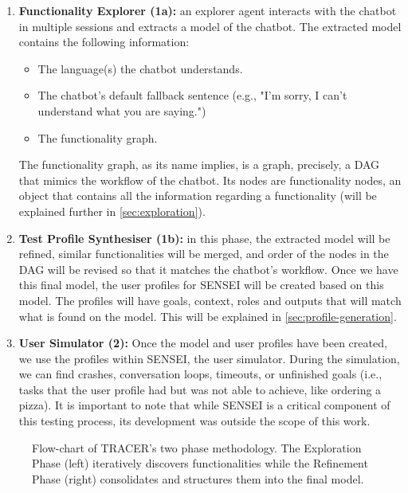 \begin{enumerate}
  \item \textbf{Functionality Explorer (1a):}
    an explorer agent interacts with the chatbot in multiple sessions
    and extracts a model of the chatbot.
    The extracted model contains the following information:
    \begin{itemize}
      \item The language(s) the chatbot understands.
      \item The chatbot's default fallback sentence (e.g., "I'm sorry, I can't understand what you are saying.")
      \item The functionality graph.
    \end{itemize}

    The functionality graph, as its name implies,
    is a graph, precisely, a \ac{DAG}
    that mimics the workflow of the chatbot.
    Its nodes are functionality nodes,
    an object that contains all the information regarding a functionality
    (will be explained further in
    \autoref{sec:exploration}).

  \item \textbf{Test Profile Synthesiser (1b):}
    in this phase, the extracted model will be refined,
    similar functionalities will be merged,
    and order of the nodes in the \ac{DAG} will be revised
    so that it matches the chatbot's workflow.
    Once we have this final model,
    the user profiles for SENSEI will be created based on this model.
    The profiles will have goals, context, roles and outputs
    that will match what is found on the model.
    This will be explained in \autoref{sec:profile-generation}.

  \item \textbf{User Simulator (2):}
    Once the model and user profiles have been created,
    we use the profiles within SENSEI, the user simulator.
    During the simulation,
    we can find crashes, conversation loops, timeouts,
    or unfinished goals (i.e., tasks that the user profile had
    but was not able to achieve, like ordering a pizza).
    It is important to note that
    while SENSEI is a critical component of this testing process,
    its development was outside the scope of this work.
\end{enumerate}


\begin{figure}[!htbp]
    \centering
    
    \caption{Flow-chart of TRACER's two phase methodology.
    The Exploration Phase (left) iteratively discovers functionalities
    while the Refinement Phase (right) consolidates and structures them into the final model.}
    \label{fig:flowchart-tracer}
\end{figure}

